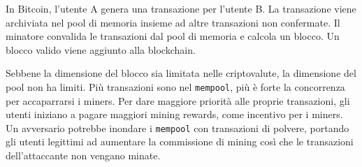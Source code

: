 In Bitcoin, l'utente A genera una transazione per l'utente B. La transazione viene archiviata nel pool di memoria insieme ad altre transazioni non confermate. Il minatore convalida le transazioni dal pool di memoria e calcola un blocco. Un blocco valido viene aggiunto alla blockchain.

Sebbene la dimensione del blocco sia limitata nelle criptovalute, la dimensione del pool non ha limiti. Più transazioni sono nel \texttt{mempool}, più è forte la concorrenza per accaparrarsi i miners. Per dare maggiore priorità alle proprie transazioni, gli utenti iniziano a pagare maggiori mining rewards, come incentivo per i miners. Un avversario potrebbe inondare i \texttt{mempool} con transazioni di polvere, portando gli utenti legittimi ad aumentare la commissione di mining così che le transazioni dell'attaccante non vengano minate.

